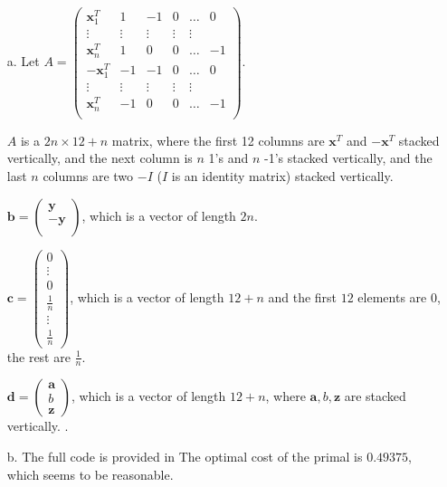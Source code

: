 \documentclass[11pt]{article}
\theoremstyle{remark}
\newcommand{\bx}{\mathbf{x}}
\newcommand{\by}{\mathbf{y}}
\newcommand{\ba}{\mathbf{a}}
\newcommand{\bc}{\mathbf{c}}
\newcommand{\bz}{\mathbf{z}}
\begin{document}
\begin{itemize}
\color{blue}
\item[a.] Let 
$A = 
\begin{pmatrix}
\bx_1^T & 1 & -1 & 0 & \hdots & 0\\
\vdots & \vdots & \vdots & \vdots & \vdots \\
\bx_n^T & 1 & 0 & 0 & \hdots & -1\\
-\bx_1^T & -1 & -1 & 0 & \hdots & 0 \\
\vdots & \vdots & \vdots & \vdots & \vdots \\
\bx_n^T & -1 & 0 & 0 & \hdots & -1 \\
\end{pmatrix}$. 

$A$ is a $2n \times 12+n$ matrix, where the first 12 columns are $\bx^T$ and $-\bx^T$ stacked vertically, and the next column is $n$ 1's and $n$ -1's stacked vertically, and the last $n$ columns are two $-I$ ($I$ is an identity matrix) stacked vertically.


$\textbf{b} = 
\begin{pmatrix}
\by \\
-\by \\
\end{pmatrix}$, which is a vector of length $2n$.

$\bc = \begin{pmatrix}
0 \\
\vdots \\
0 \\
\frac{1}{n} \\
\vdots \\
\frac{1}{n}
\end{pmatrix}$, which is a vector of length $12+n$ and the first $12$ elements are $0$, the rest are $\frac{1}{n}$.

$\textbf{d} = 
\begin{pmatrix}
\ba \\
b \\
\bz
\end{pmatrix}$, which is a vector of length $12+n$, where $\ba,b,\bz$ are stacked vertically.
.
\item[b.]
The full code is provided in 
The optimal cost of the primal is $0.49375$, which seems to be reasonable.
\end{itemize}
\color{black}
\end{document}
